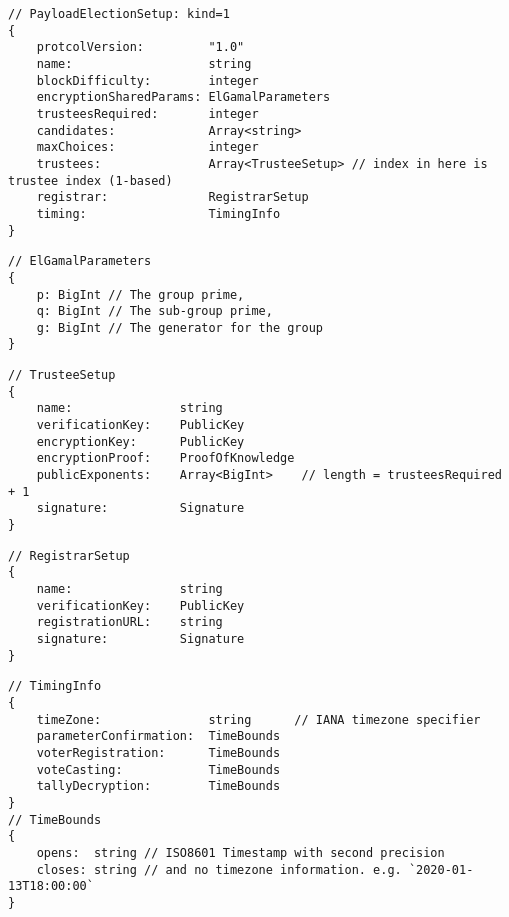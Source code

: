 \label{dt:payload:setup}
\begin{lstlisting}[style=ES6]
// PayloadElectionSetup: kind=1
{
    protcolVersion:         "1.0"
    name:                   string
    blockDifficulty:        integer
    encryptionSharedParams: ElGamalParameters
    trusteesRequired:       integer
    candidates:             Array<string>
    maxChoices:             integer
    trustees:               Array<TrusteeSetup> // index in here is trustee index (1-based)
    registrar:              RegistrarSetup
    timing:                 TimingInfo
}
\end{lstlisting}
\vspace*{-0.95em}
\label{dt:elgamal:params}
\begin{lstlisting}[style=ES6, firstnumber=last]
// ElGamalParameters
{
    p: BigInt // The group prime,
    q: BigInt // The sub-group prime,
    g: BigInt // The generator for the group
}
\end{lstlisting}
\newpage
\label{dt:trustee}
\begin{lstlisting}[style=ES6, firstnumber=last]
// TrusteeSetup
{
    name:               string
    verificationKey:    PublicKey
    encryptionKey:      PublicKey
    encryptionProof:    ProofOfKnowledge
    publicExponents:    Array<BigInt>    // length = trusteesRequired + 1
    signature:          Signature
}
\end{lstlisting}
\vspace*{-0.95em}
\label{dt:registrar}
\begin{lstlisting}[style=ES6, firstnumber=last]
// RegistrarSetup
{
    name:               string
    verificationKey:    PublicKey
    registrationURL:    string
    signature:          Signature
}
\end{lstlisting}
\vspace*{-0.95em}
\label{dt:timing}
\begin{lstlisting}[style=ES6, firstnumber=last]
// TimingInfo
{
    timeZone:               string      // IANA timezone specifier
    parameterConfirmation:  TimeBounds
    voterRegistration:      TimeBounds
    voteCasting:            TimeBounds
    tallyDecryption:        TimeBounds
}
// TimeBounds
{
    opens:  string // ISO8601 Timestamp with second precision
    closes: string // and no timezone information. e.g. `2020-01-13T18:00:00`
}
\end{lstlisting}

